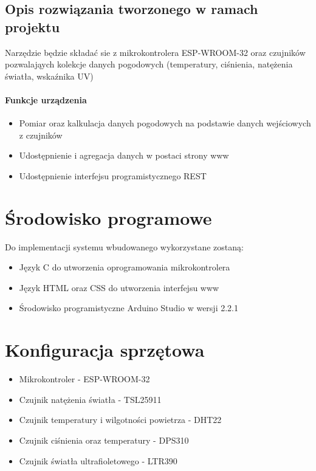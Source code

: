 \documentclass[12pt,a4paper]{article}
\begin{document}
\subsection{Opis rozwiązania tworzonego w ramach projektu}

Narzędzie będzie składać sie z mikrokontrolera ESP-WROOM-32 oraz czujników pozwalająych kolekcje danych pogodowych (temperatury, ciśnienia, natężenia światła, wskaźnika UV)

\paragraph{Funkcje urządzenia}
\begin{itemize}
    \item Pomiar oraz kalkulacja danych pogodowych na podstawie danych wejściowych z czujników
    \item Udostępnienie i agregacja danych w postaci strony www
    \item Udostępnienie interfejsu programistycznego REST 
\end{itemize}

\section{Środowisko programowe}
Do implementacji systemu wbudowanego wykorzystane zostaną:
\begin{itemize}
    \item Język C do utworzenia oprogramowania mikrokontrolera
    \item Język HTML oraz CSS do utworzenia interfejsu www
    \item Środowisko programistyczne Arduino Studio w wersji 2.2.1
\end{itemize}

\section{Konfiguracja sprzętowa}

\begin{itemize}
    \item Mikrokontroler - ESP-WROOM-32
    \item Czujnik natężenia światła - TSL25911
    \item Czujnik temperatury i wilgotności powietrza - DHT22
    \item Czujnik ciśnienia oraz temperatury - DPS310
    \item Czujnik światła ultrafioletowego - LTR390
\end{itemize}
\end{document}
